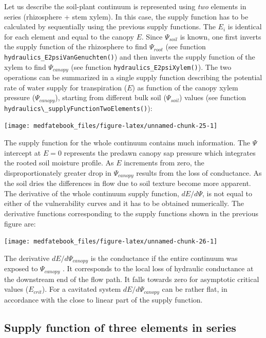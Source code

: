 \documentclass[]{book}
\begin{document}
Let us describe the soil-plant continuum is represented using \emph{two} elements in series (rhizosphere + stem xylem). In this case, the supply function has to be calculated by sequentially using the previous supply functions. The \(E_i\) is identical for each element and equal to the canopy \(E\). Since \(\Psi_{soil}\) is known, one first inverts the supply function of the rhizosphere to find \(\Psi_{root}\) (see function \texttt{hydraulics\_E2psiVanGenuchten()}) and then inverts the supply function of the xylem to find \(\Psi_{canopy}\) (see function \texttt{hydraulics\_E2psiXylem()}). The two operations can be summarized in a single supply function describing the potential rate of water supply for transpiration (\(E\)) as function of the canopy xylem pressure (\(\Psi_{canopy}\)), starting from different bulk soil (\(\Psi_{soil}\)) values (see function \texttt{hydraulics\textbackslash{}\_supplyFunctionTwoElements()}):

\begin{center}\texttt{[image: medfatebook\_files/figure-latex/unnamed-chunk-25-1]} \end{center}

The supply function for the whole continuum contains much information. The \(\Psi\) intercept at \(E=0\) represents the predawn canopy sap pressure which integrates the rooted soil moisture profile. As \(E\) increments from zero, the disproportionately greater drop in \(\Psi_{canopy}\) results from the loss of conductance. As the soil dries the differences in flow due to soil texture become more apparent. The derivative of the whole continuum supply function, \(dE/d\Psi\), is not equal to either of the vulnerability curves and it has to be obtained numerically. The derivative functions corresponding to the supply functions shown in the previous figure are:

\begin{center}\texttt{[image: medfatebook\_files/figure-latex/unnamed-chunk-26-1]} \end{center}

The derivative \(dE/d\Psi_{canopy}\) is the conductance if the entire continuum was exposed to \(\Psi_{canopy}\) \citep{Sperry2015}. It corresponds to the local loss of hydraulic conductance at the downstream end of the flow path. It falls towards zero for asymptotic critical values (\(E_{crit}\)). For a cavitated system \(dE/d\Psi_{canopy}\) can be rather flat, in accordance with the close to linear part of the supply function.

\hypertarget{supply-function-of-three-elements-in-series}{%
\subsection{Supply function of three elements in series}\label{supply-function-of-three-elements-in-series}}
\end{document}
